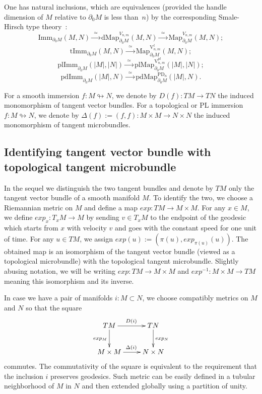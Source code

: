 \documentclass[11pt]{amsart}
\theoremstyle{definition}
\newcommand{\Imm}{\mathrm{Imm}}
\newcommand{\tImm}{\mathrm{tImm}}
\newcommand{\plImm}{\mathrm{plImm}}
\newcommand{\pdImm}{\mathrm{pdImm}}
\newcommand{\Map}{\mathrm{Map}}
\newcommand{\dMap}{\mathrm{dMap}}
\newcommand{\plMap}{\mathrm{plMap}}
\newcommand{\pdMap}{\mathrm{pdMap}}
\newcommand{\PD}{\mathrm{PD}}
\newcommand{\VV}{\mathrm{V}}
\numberwithin{equation}{section}
\begin{document}
One has natural inclusions, which are equivalences (provided the handle dimension of $M$ relative to $\partial_0M$ is less than~$n$) by the corresponding Smale-Hirsch type theory~\cite{Smale_imm,Hirsch,Lees,Kurata,HaeflPoen_imm}:
\[
\Imm_{\partial_0 M}(M,N)\xrightarrow{\,\,\simeq\,\,} \dMap_{\partial_0M}^{V_{n,m}}(M,N)\xrightarrow{\,\,\simeq\,\,} 
\Map_{\partial_0M}^{V_{n,m}}(M,N);
\]
\[
\tImm_{\partial_0 M}(M,N) \xrightarrow{\,\,\simeq\,\,} \Map_{\partial_0M}^{\VV_{n,m}^t}(M,N);
\]
\[
\plImm_{\partial_0 M}(|M|,|N|) \xrightarrow{\,\,\simeq\,\,} \plMap_{\partial_0M}^{\VV_{n,m}^{pl}}(|M|,|N|);
\]
\[
\pdImm_{\partial_0 M}(|M|,N) \xrightarrow{\,\,\simeq\,\,} \pdMap_{\partial_0M}^{\PD_n}(|M|,N).
\]

For a smooth immersion $f\colon M\looparrowright N$, we denote by $D(f)\colon TM\to TN$ the induced
monomorphism of tangent vector bundles. For a topological or PL immersion $f\colon M\looparrowright N$, we denote by $\Delta(f):=(f,f)\colon M\times M\to N\times N$ the induced monomorphism of
 tangent microbundles. 

\subsection{Identifying  tangent vector bundle with  topological tangent microbundle}\label{ss:tangent_id}

In the sequel we  distinguish the two tangent bundles and 
denote by $TM$ only the tangent vector bundle of a smooth manifold $M$. To identify 
the two, we choose a Riemannian metric on $M$ and  define a map $exp\colon TM\to M\times M$. For any $x\in M$, we define $exp_x\colon T_xM\to  M$
by sending $v\in T_xM$ to the endpoint of the geodesic which starts from $x$ with velocity $v$ and goes  with the constant speed for one unit of time. For any $u\in TM$, we assign $exp(u):=(\pi(u),exp_{\pi(u)}(u))$. The obtained map is an isomorphism of the tangent vector 
bundle (viewed as a topological microbundle) with the topological tangent microbundle. Slightly abusing notation, we will be writing $exp\colon TM\to M\times M$
and $exp^{-1}\colon M\times M\to TM$ meaning this isomorphism and its inverse.

In case we have a pair of manifolds $i\colon M\subset N$, we choose compatibly metrics on $M$ and $N$ so that the square
\begin{equation}\label{eq:exp_MN}
\xymatrix{
TM\ar[d]_{exp_M}\ar[r]^{D(i)}&TN\ar[d]^{exp_N}\\
M\times M\ar[r]^{\Delta(i)}& N\times N
}
\end{equation}
commutes. The commutativity of the square is equivalent to the requirement that the inclusion $i$ preserves geodesics. Such metric  can be easily defined in a tubular neighborhood of $M$ in $N$ and then extended globally using a partition of unity.
\end{document}
